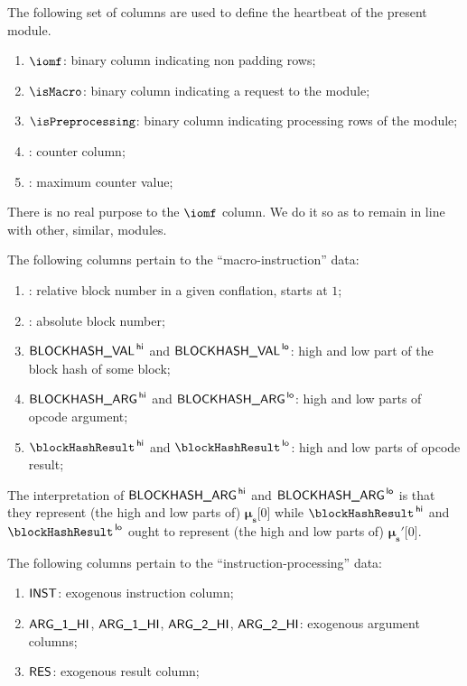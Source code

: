The following set of columns are used to define the heartbeat of the present module.
\begin{enumerate}
	\item $\iomf$:
		binary column indicating non padding rows;
	\item $\isMacro$:
		binary column indicating a request to the \blockHashMod{} module;
	\item $\isPreprocessing$:
		binary column indicating processing rows of the \blockHashMod{} module;
	\item \ct:
		counter column;
	\item \ctMax:
		maximum counter value;
\end{enumerate}
\saNote{}
There is no real purpose to the $\iomf$ column.
We do it so as to remain in line with other, similar, modules.

\noindent The following columns pertain to the ``macro-instruction'' data:
\begin{enumerate}[resume]
	\item \relBlock{}: 
		relative block number in a given conflation, starts at $1$;
	\item \absBlock{}:
		absolute block number;
	\item $\textsf{BLOCKHASH\_VAL}^{\mathsf{\,hi}}$ and $\textsf{BLOCKHASH\_VAL}^{\mathsf{\,lo}}$: 
		high and low part of the block hash of some block;
	\item $\textsf{BLOCKHASH\_ARG}^{\mathsf{\,hi}}$ and $\textsf{BLOCKHASH\_ARG}^{\mathsf{\,lo}}$: 
		high and low parts of  opcode argument;
	\item $\blockHashResult\high$ and $\blockHashResult\low$:
		high and low parts of  opcode result;
\end{enumerate}
\saNote{}
The interpretation of $\textsf{BLOCKHASH\_ARG}^{\mathsf{\,hi}}$ and $\textsf{BLOCKHASH\_ARG}^{\mathsf{\,lo}}$ is that they represent
(the high and low parts of) $\bm{\mu}_\textbf{s}\big[0\big]$
while $\blockHashResult\high$ and $\blockHashResult\low$ ought to represent
(the high and low parts of) $\bm{\mu}_\textbf{s}'\big[0\big]$.

\noindent The following columns pertain to the ``instruction-processing'' data:
\begin{enumerate}[resume]
	\item $\textsf{INST}$:
		exogenous instruction column;
	\item $\textsf{ARG}\textsf{\_1}\textsf{\_HI}$, $\textsf{ARG}\textsf{\_1}\textsf{\_HI}$, $\textsf{ARG}\textsf{\_2}\textsf{\_HI}$, $\textsf{ARG}\textsf{\_2}\textsf{\_HI}$:
		exogenous argument columns;
	\item $\textsf{RES}$:
		exogenous result column;
\end{enumerate}
